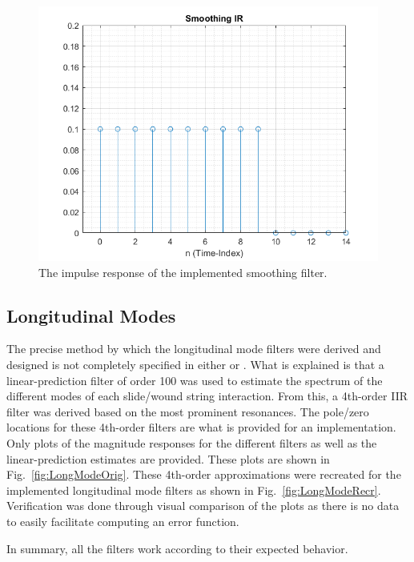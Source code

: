 \documentclass[../main.tex]{subfiles}
\begin{document}
\begin{figure}[!h]
    \centering
    \includegraphics[scale=.53]{./images/plots/SmoothingIR.png}
    \caption{The impulse response of the implemented smoothing filter.}
    \label{fig:SmoothingIR}
\end{figure}

\subsection{Longitudinal Modes}
The precise method by which the longitudinal mode filters were derived and designed is not completely specified in either  or . What is explained is that a linear-prediction filter of order 100 was used to estimate the spectrum of the different modes of each slide/wound string interaction. From this, a 4th-order IIR filter was derived based on the most prominent resonances. The pole/zero locations for these 4th-order filters are what is provided for an implementation. Only plots of the magnitude responses for the different filters as well as the linear-prediction estimates are provided. These plots are shown in Fig.~\ref{fig:LongModeOrig}. These 4th-order approximations were recreated for the implemented longitudinal mode filters as shown in Fig.~\ref{fig:LongModeRecr}. Verification was done through visual comparison of the plots as there is no data to easily facilitate computing an error function. 

In summary, all the filters work according to their expected behavior.
\end{document}
